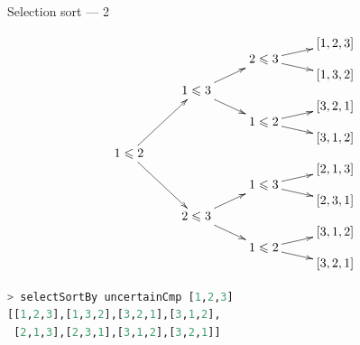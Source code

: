 \documentclass[handout]{beamer}
\def\le{\leqslant}
\begin{document}
\begin{frame}[fragile]{Selection sort --- 2}

\vspace{-4ex}

$$\xymatrix@R-2.2pc{
                             &                          &                        & [1,2,3] \\
                             &                          & 2 \le 3 \ar[ur]\ar[dr] &         \\
                             &                          &                        & [1,3,2] \\
                             & 1 \le 3 \ar[uur]\ar[ddr] &                        &         \\
                             &                          &                        & [3,2,1] \\
                             &                          & 1 \le 2 \ar[ur]\ar[dr] &         \\
                             &                          &                        & [3,1,2] \\
1 \le 2 \ar[uuuur]\ar[ddddr] &                          &                        &         \\
                             &                          &                        & [2,1,3] \\
                             &                          & 1 \le 3 \ar[ur]\ar[dr] &         \\
                             &                          &                        & [2,3,1] \\
                             & 2 \le 3 \ar[uur]\ar[ddr] &                        &         \\
                             &                          &                        & [3,1,2] \\
                             &                          & 1 \le 2 \ar[ur]\ar[dr] &         \\
                             &                          &                        & [3,2,1] \\
}$$

\vspace{-3ex}

\begin{lstlisting}[language=Haskell]
> selectSortBy uncertainCmp [1,2,3]
[[1,2,3],[1,3,2],[3,2,1],[3,1,2],
 [2,1,3],[2,3,1],[3,1,2],[3,2,1]]
\end{lstlisting}

\end{frame}
\end{document}
